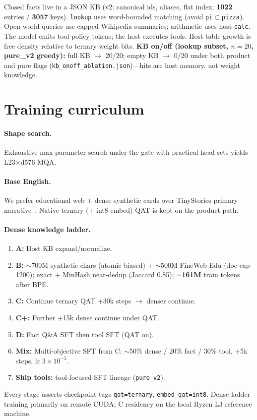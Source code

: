 \documentclass[11pt,a4paper]{article}
\begin{document}
Closed facts live in a JSON KB (v2: canonical ids, aliases, flat index; \textbf{1022} entries / \textbf{3057} keys).
\texttt{lookup} uses word-bounded matching (avoid \texttt{pi}$\subset$\texttt{pizza}).
Open-world queries use capped Wikipedia summaries; arithmetic uses host \texttt{calc}.
The model emits tool-policy tokens; the host executes tools.
Host table growth is free density relative to ternary weight bits.
\textbf{KB on/off (lookup subset, $n{=}20$, pure\_v2 greedy):} full KB $\rightarrow$ 20/20; empty KB $\rightarrow$ 0/20 under both product and pure flags (\texttt{kb\_onoff\_ablation.json})---hits are host memory, not weight knowledge.

\section{Training curriculum}
\label{sec:train}

\paragraph{Shape search.}
Exhaustive max-parameter search under the gate with practical head sets yields L23$\times$d576 MQA.

\paragraph{Base English.}
We prefer educational web + dense synthetic cards over TinyStories-primary narrative~\citep{eldan2023tinystories}.
Native ternary (+ int8 embed) QAT is kept on the product path.

\paragraph{Dense knowledge ladder.}
\begin{enumerate}[leftmargin=*,itemsep=1pt]
  \item \textbf{A:} Host KB expand/normalize.
  \item \textbf{B:} $\sim$700M synthetic chars (atomic-biased) + $\sim$500M FineWeb-Edu (doc cap 1200); exact + MinHash near-dedup (Jaccard 0.85); $\sim$\textbf{161M} train tokens after BPE.
  \item \textbf{C:} Continue ternary QAT +30k steps $\rightarrow$ denser continue.
  \item \textbf{C+:} Further +15k dense continue under QAT.
  \item \textbf{D:} Fact Q\&A SFT then tool SFT (QAT on).
  \item \textbf{Mix:} Multi-objective SFT from C: $\sim$50\% dense / 20\% fact / 30\% tool, +5k steps, lr $3{\times}10^{-5}$.
  \item \textbf{Ship tools:} tool-focused SFT lineage (\texttt{pure\_v2}).
\end{enumerate}
Every stage asserts checkpoint tags \texttt{qat=ternary}, \texttt{embed\_qat=int8}.
Dense ladder training primarily on remote CUDA; C residency on the local Ryzen L3 reference machine.
\end{document}

